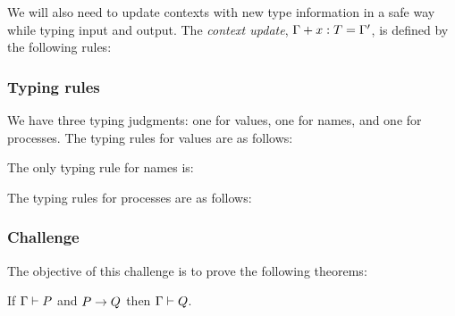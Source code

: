 We will also need to update contexts with new type information in a safe way while typing input and output.
The \emph{context update}, \( \Cupdate{\Gamma}{\hastype{x}{T}} = \Gamma' \), is defined by the following rules:

\subsubsection{Typing rules}
We have three typing judgments: one for values, one for names, and one for processes.
The typing rules for values are as follows:
The only typing rule for names is:
\begin{mathpar}
\end{mathpar}
The typing rules for processes are as follows:

\subsubsection{Challenge}
The objective of this challenge is to prove the following theorems:
\begin{theorem}
  If \( \types{\Gamma}{P} \) and \( \reduces{P}{Q} \) then \( \types{\Gamma}{Q} \).
\end{theorem}

